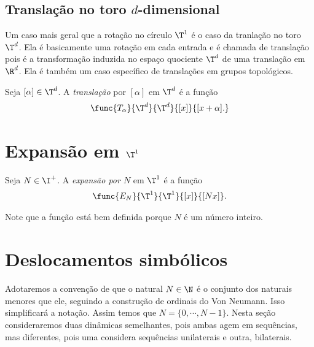 \subsection{Translação no toro $d$-dimensional}

Um caso mais geral que a rotação no círculo $\T^1$ é o caso da tranlação no toro $\T^d$. Ela é basicamente uma rotação em cada entrada e é chamada de translação pois é a transformação induzida no espaço quociente $\T^d$ de uma translação em $\R^d$. Ela é também um caso específico de translações em grupos topológicos.

\begin{definition}
Seja $[\alpha] \in \T^d$. A \emph{translação} por $[\alpha]$ em $\T^d$ é a função
	\begin{align*}
	\func{T_\alpha}{\T^d}{\T^d}{[x]}{[x+\alpha].}
	\end{align*}
\end{definition}


\section{Expansão em \ensuremath{\T^1}}

\begin{definition}
Seja $N \in \I^+$. A \emph{expansão por $N$} em $\T^1$ é a função
	\begin{align*}
	\func{E_N}{\T^1}{\T^1}{[x]}{[Nx]}.
	\end{align*}
\end{definition}

Note que a função está bem definida porque $N$ é um número inteiro.


\section{Deslocamentos simbólicos}

Adotaremos a convenção de que o natural $N \in \N$ é o conjunto dos naturais menores que ele, seguindo a construção de ordinais do Von Neumann. Isso simplificará a notação. Assim temos que $N = \{0,\cdots,N-1\}$. Nesta seção consideraremos duas dinâmicas semelhantes, pois ambas agem em sequências, mas diferentes, pois uma considera sequências unilaterais e outra, bilaterais.

